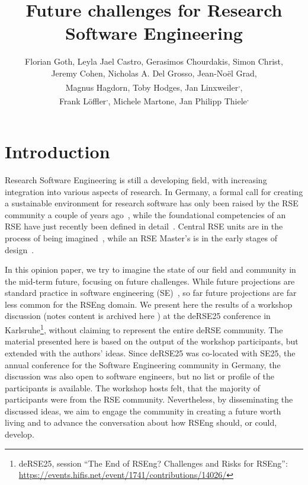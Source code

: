 \documentclass{eceasst}
\title{Future challenges for Research Software Engineering} %
\author{
Florian Goth\authorOrcid{0000-0003-2707-4790}\authorRef{1},
Leyla Jael Castro\authorOrcid{0000-0003-3986-0510}\authorRef{2},
Gerasimos Chourdakis\authorOrcid{0000-0002-3977-1385}\authorRef{3},
Simon Christ\authorOrcid{0000-0002-5866-1472}\authorRef{4},
\texorpdfstring{\\}{} %
Jeremy Cohen\authorOrcid{0000-0003-4312-2537}\authorRef{5},
Nicholas A. Del Grosso\thinspace\authorRef{6},
Jean-Noël Grad\authorOrcid{0000-0002-5821-4912}\authorRef{7},
\texorpdfstring{\\}{} %
Magnus Hagdorn\authorOrcid{0000-0002-5076-4864}\authorRef{8},
Toby Hodges\authorOrcid{0000-0003-1766-456X}\authorRef{9},
Jan Linxweiler\authorOrcid{0000-0002-2755-5087}\authorRef{10}\textsuperscript{,}\authorRef{11},
\texorpdfstring{\\}{} %
Frank Löffler\authorOrcid{0000-0001-6643-6323}\authorRef{12}\textsuperscript{,}\authorRef{11},
Michele Martone\authorOrcid{0000-0003-3239-8554}\authorRef{13},
Jan Philipp Thiele\authorOrcid{0000-0002-8901-6660}\authorRef{10}\textsuperscript{,}\authorRef{14}
} %
\institute{%
\autlabel{1} Institut für theoretische Physik 1, University of Würzburg, 97074, Würzburg, Germany\\
\autlabel{2} ZB MED Information Centre for Life Sciences, Cologne, Germany\\
\autlabel{3} Institute for Parallel and Distributed Systems, University of Stuttgart, Stuttgart, Germany\\
\autlabel{4} Leibniz University Hannover, Department of Cell Biology and Biophysics, Computational Biology, Germany\\
\autlabel{5} Imperial College London, London, UK\\
\autlabel{6} Institute for Experimental Epileptology and Cognition Research, Uniklinikum Bonn, Germany\\
\autlabel{7} Institute for Computational Physics, University of Stuttgart, Germany\\
\autlabel{8} Geschäftsbereich IT, Charité Universitätsmedizin Berlin, Germany\\
\autlabel{9} The Carpentries, USA\\
\autlabel{10} Technische Universität Braunschweig, Germany\\
\autlabel{11} de-RSE e.V.---Society for Research Software in Germany\\
\autlabel{12} Competence Center Digital Research, Friedrich Schiller University Jena, Germany\\
\autlabel{13} Independent researcher, Germany\\
\autlabel{14} Weierstrass Institute, Berlin, Germany;
              Leibniz University Hannover, Institute of Applied Mathematics, Scientific Computing, Hannover, Germany\\
}
\begin{document}
\maketitle

\section{Introduction}

Research Software Engineering is still a developing field,
with increasing integration into various aspects of research.
In Germany, a formal call for creating a sustainable environment for research software has only been raised by the RSE community a couple of years ago~\cite{Anzt2021},
while the foundational competencies of an RSE have just recently been defined in detail~\cite{Goth2024}.
Central RSE units are in the process of being imagined~\cite{Kempf2025-draft},
while an RSE Master's is in the early stages of design~\cite{Dehne2025-draft}.

In this opinion paper, we try to imagine the state of our field
and community in the mid-term future, focusing on future challenges.
While future projections are standard practice in software engineering (SE)~\cite{Katz2023,Khan2021,Hu2023,Bosch2016a,Boehm2011},
so far future projections are far less common for the RSEng domain.
We present here the results of a workshop discussion (notes content is archived here \cite{goth2025_WSPad}) at the
deRSE25 conference in Karlsruhe\footnote{deRSE25, session ``The End of {RSEng}?
Challenges and Risks for {RSEng}'': \url{https://events.hifis.net/event/1741/contributions/14026/}},
without claiming to represent the entire deRSE community.
The material presented here is based on the output of the workshop participants, but extended with the authors' ideas.
Since deRSE25 was co-located with SE25, the annual conference for the Software Engineering community in Germany, the discussion was also open to software engineers,
but no list or profile of the participants is available.
The workshop hosts felt, that the majority of participants were from the RSE community.
Nevertheless, by disseminating the discussed ideas,
we aim to engage the community in creating a future worth living
and to advance the conversation about how RSEng should, or could, develop.
\end{document}
